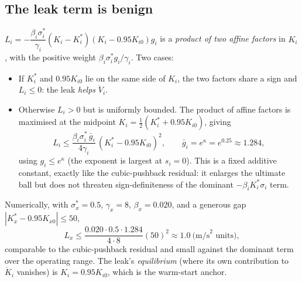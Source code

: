 \documentclass[11pt]{article}
\theoremstyle{plain}
\theoremstyle{definition}
\begin{document}
\subsection{The leak term is benign}
$L_i=-\dfrac{\beta_i\sigma^{\!*}_i}{\gamma_i}(K_i-K_i^*)(K_i-0.95K_{i0})g_i$ is a
\emph{product of two affine factors} in $K_i$, with the positive weight
$\beta_i\sigma^{\!*}_i g_i/\gamma_i$. Two cases:
\begin{itemize}[leftmargin=1.5em]
\item If $K_i^*$ and $0.95K_{i0}$ lie on the same side of $K_i$, the two factors share
a sign and $L_i\le0$: the leak \emph{helps} $\dot V_i$.
\item Otherwise $L_i>0$ but is uniformly bounded. The product of affine factors is
maximised at the midpoint $K_i=\tfrac12(K_i^*+0.95K_{i0})$, giving
\begin{equation}
L_i\le\frac{\beta_i\sigma^{\!*}_i\,\bar g_i}{4\gamma_i}\,(K_i^*-0.95K_{i0})^2,
\qquad \bar g_i=e^{\kappa}=e^{0.25}\approx1.284,
\label{eq:Lbound}
\end{equation}
using $g_i\le e^{\kappa}$ (the exponent is largest at $s_i=0$). This is a fixed
additive constant, exactly like the cubic-pushback residual: it enlarges the ultimate
ball but does not threaten sign-definiteness of the dominant $-\beta_iK_i^*\sigma_i$
term.
\end{itemize}
Numerically, with $\sigma^{\!*}_x=0.5$, $\gamma_x=8$, $\beta_x=0.020$, and a generous
gap $|K_x^*-0.95K_{x0}|\le50$,
\[
L_x\le\frac{0.020\cdot0.5\cdot1.284}{4\cdot8}(50)^2\approx1.0\ \text{(m/s}^2\text{ units)},
\]
comparable to the cubic-pushback residual and small against the dominant term over
the operating range. The leak's \emph{equilibrium} (where its own contribution to
$\dot K_i$ vanishes) is $K_i=0.95K_{i0}$, which is the warm-start anchor.
\end{document}
